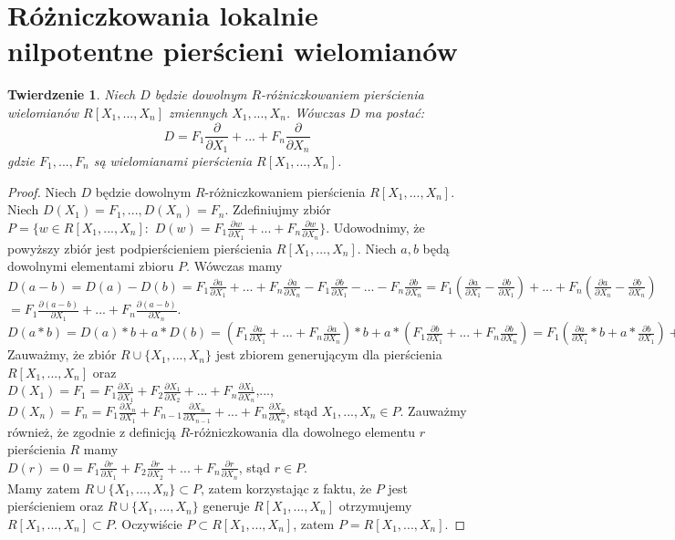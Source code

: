 \documentclass[12pt,a4paper]{article}
\newtheorem{twr}{Twierdzenie}[section]
\numberwithin{equation}{section}
\begin{document}
\section{Różniczkowania lokalnie nilpotentne pierścieni wielomianów}

\begin{twr}
Niech $D$ będzie dowolnym $R$-różniczkowaniem pierścienia wielomianów $R[X_{1},...,X_{n}]$ zmiennych $X_1,...,X_n$. Wówczas $D$ ma postać:
$$D=F_1 \frac{\partial}{\partial X_1}+...+F_n \frac{\partial}{\partial X_n}$$
gdzie $F_1,...,F_n$ są wielomianami pierścienia $R[X_{1},...,X_{n}]$.
\end{twr}

\begin{proof}
Niech $D$ będzie dowolnym $R$-różniczkowaniem pierścienia $R[X_{1},...,X_{n}]$. 
Niech $D(X_1)=F_1,...,D(X_n)=F_n$.
Zdefiniujmy zbiór $P=\{ w\in R[X_1,...,X_n]:$ $D(w)=F_1 \frac{\partial w}{\partial X_1}+...+F_n \frac{\partial w}{\partial X_n}\}$.
Udowodnimy, że powyższy zbiór jest podpierścieniem pierścienia $R[X_1,...,X_n]$. Niech $a,b$ będą dowolnymi elementami zbioru $P$. Wówczas mamy
\\$D(a-b)=D(a)-D(b)=F_1 \frac{\partial a}{\partial X_1}+...+F_n \frac{\partial a}{\partial X_n}-F_1 \frac{\partial b}{\partial X_1}-...-F_n \frac{\partial b}{\partial X_n}=F_1 (\frac{\partial a}{\partial X_1}-\frac{\partial b}{\partial X_1})+...+F_n (\frac{\partial a}{\partial X_n}-\frac{\partial b}{\partial X_n})$\\$
=F_1 \frac{\partial (a-b)}{\partial X_1}+...+F_n \frac{\partial (a-b)}{\partial X_n}$.
\\$D(a*b)=D(a)*b+a*D(b)=(F_1 \frac{\partial a}{\partial X_1}+...+F_n \frac{\partial a}{\partial X_n})*b+a*(F_1 \frac{\partial b}{\partial X_1}+...+F_n \frac{\partial b}{\partial X_n})=F_1(\frac{\partial a}{\partial X_1}*b+a*\frac{\partial b}{\partial X_1})+...+F_n(\frac{\partial a}{\partial X_n}*b+a*\frac{\partial b}{\partial X_n})=F_1 \frac{\partial (a*b)}{\partial X_1}+...+F_n \frac{\partial (a*b)}{\partial X_n}$
\\Zauważmy, że zbiór $R\cup \{ X_1,...,X_n\}$ jest zbiorem generującym dla pierścienia $R[X_1,...,X_n]$ oraz
\\$D(X_1)=F_1=F_1 \frac{\partial X_1}{\partial X_1}+ F_2 \frac{\partial X_1}{\partial X_2}+...+F_n \frac{\partial X_1}{\partial X_n}$,...,$D(X_n)=F_n=F_1 \frac{\partial X_n}{\partial X_1}+ F_{n-1} \frac{\partial X_n}{\partial X_{n-1}}+...+F_n \frac{\partial X_n}{\partial X_n}$, stąd $X_1,...,X_n \in P$. Zauważmy również, że zgodnie z definicją $R$-różniczkowania dla dowolnego elementu $r$ pierścienia $R$ mamy
\\$D(r)=0=F_1 \frac{\partial r}{\partial X_1}+ F_2 \frac{\partial r}{\partial X_2}+...+F_n \frac{\partial r}{\partial X_n}$, stąd $r\in P$.
\\Mamy zatem $R\cup \{ X_1,...,X_n\} \subset P$, zatem korzystając z faktu, że $P$ jest pierścieniem oraz  $R\cup \{ X_1,...,X_n\}$ generuje $R[X_1,...,X_n]$ otrzymujemy\\
$R[X_1,...,X_n]\subset P$. Oczywiście $P\subset R[X_1,...,X_n]$, zatem $P=R[X_1,...,X_n]$.
\end{proof}
\end{document}
